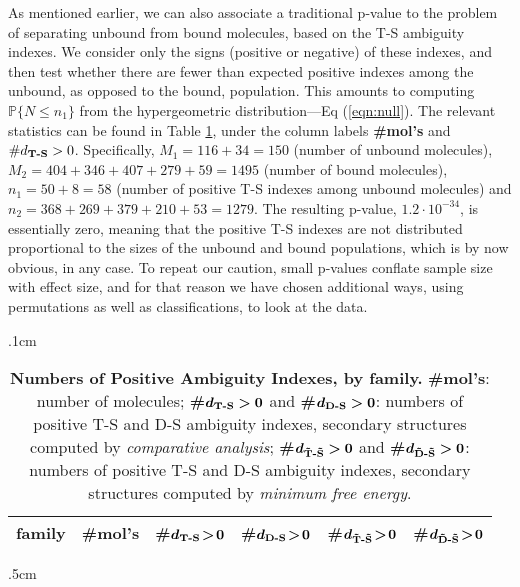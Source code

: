 \documentclass[10pt,letterpaper]{article}
\begin{document}
As mentioned earlier, we can also associate a traditional p-value to the problem of separating unbound from bound molecules, based on the T-S ambiguity indexes. We consider only the signs (positive or negative) of these indexes, and then test whether there are fewer than expected positive indexes among the unbound, as opposed to the bound, population. This amounts to computing $\mathbb{P}\{N\leq n_1\}$ from the hypergeometric distribution---Eq (\ref{eqn:null}). The relevant statistics can be found in Table \ref{table:NumberPositive}, 
under the column labels {\bf \#mol's} and $\bm \#d_\text{\bf T-S}>0$. Specifically, 
$M_1=116+34=150$ (number of unbound molecules),
$M_2=404+346+407+279+59=1495$ (number of bound molecules), $n_1=50+8=58$ (number of positive T-S indexes among unbound molecules) and $n_2=368+269+379+210+53=1279$.
The resulting p-value, $1.2\cdot 10^{-34}$, is essentially zero, meaning that the positive T-S indexes are not distributed proportional to the sizes of the unbound and bound populations, which is by now obvious, in any case. To repeat our caution, small p-values conflate sample size with effect size, and for that reason we have chosen additional ways, using permutations as well as classifications, to look at the data.

\vglue .1cm
\begin{table}[h!]
\begin{center}
\begin{tabular}{ l || r | r | r | r | r}
\hglue 5mm 
{\bf family} & {\bf \#mol's} & {\bf\#}$\bm{d_\text{\bf T-S}\!>\!0}$ &
{\bf\#}$\bm{d_\text{\bf D-S}\!>\!0}$ & {\bf\#}$\bm{d_\text{\bf \~T-\~S}\!>\!0}$ & {\bf\#}$\bm{d_\text{\bf \~D-\~S}\!>\!0}$ \\ \hline \hline

\end{tabular}
\vglue .5cm
\caption{\footnotesize {\bf Numbers of Positive Ambiguity Indexes, by family.} 
{\bf \#mol's}: number of molecules; {\bf\#}$\bm{d_\text{\bf T-S}>0}$ and 
 {\bf\#}$\bm{d_\text{\bf D-S}>0}$: numbers of positive T-S and D-S ambiguity indexes, secondary structures computed by {\em comparative analysis}; 
 {\bf\#}$\bm{d_\text{\bf \~T-\~S}>0}$ and {\bf\#}$\bm{d_\text{\bf \~D-\~S}>0}$: numbers of positive T-S and D-S ambiguity indexes, secondary structures computed by {\em minimum free energy}.
} 
\label{table:NumberPositive}
\end{center}
\end{table}
\end{document}
